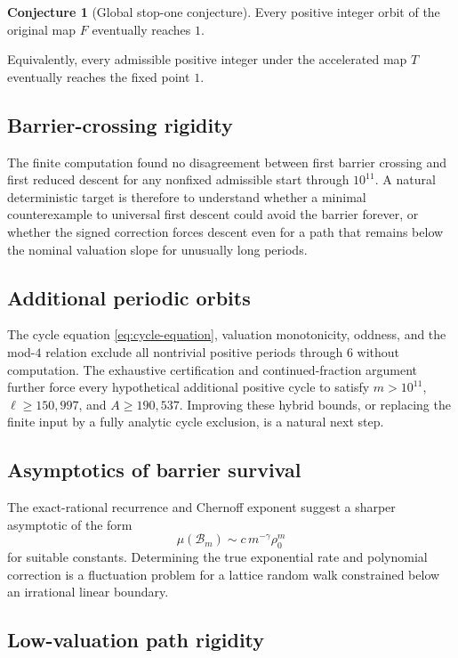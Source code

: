 \documentclass[11pt]{article}
\theoremstyle{definition}
\newtheorem{conjecture}[theorem]{Conjecture}
\theoremstyle{remark}
\begin{document}
\begin{conjecture}[Global stop-one conjecture]
Every positive integer orbit of the original map $F$ eventually reaches $1$.
\end{conjecture}
Equivalently, every admissible positive integer under the accelerated map $T$ eventually reaches the fixed point $1$.

\subsection{Barrier-crossing rigidity}

The finite computation found no disagreement between first barrier crossing and first reduced descent for any nonfixed admissible start through $10^{11}$.  A natural deterministic target is therefore to understand whether a minimal counterexample to universal first descent could avoid the barrier forever, or whether the signed correction forces descent even for a path that remains below the nominal valuation slope for unusually long periods.

\subsection{Additional periodic orbits}

The cycle equation \eqref{eq:cycle-equation}, valuation monotonicity, oddness, and the mod-$4$ relation exclude all nontrivial positive periods through $6$ without computation.  The exhaustive certification and continued-fraction argument further force every hypothetical additional positive cycle to satisfy $m>10^{11}$, $\ell\ge150{,}997$, and $A\ge190{,}537$.  Improving these hybrid bounds, or replacing the finite input by a fully analytic cycle exclusion, is a natural next step.

\subsection{Asymptotics of barrier survival}

The exact-rational recurrence and Chernoff exponent suggest a sharper asymptotic of the form
\[
\mu(\mathcal B_m)\sim c\,m^{-\gamma}\rho_0^m
\]
for suitable constants.  Determining the true exponential rate and polynomial correction is a fluctuation problem for a lattice random walk constrained below an irrational linear boundary.

\subsection{Low-valuation path rigidity}
\end{document}
